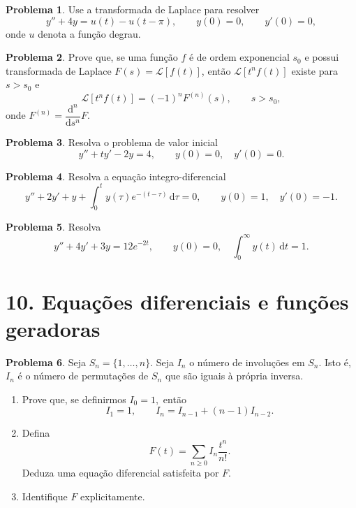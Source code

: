 \documentclass[10pt,a4paper]{amsart}
\renewcommand{\d}{\mathrm{d}}
\theoremstyle{definition}
\newtheorem{problema}{Problema}
\begin{document}
\begin{problema}
Use a transformada de Laplace para resolver
\[
    y''+4y=u(t)-u(t-\pi),
    \qquad y(0)=0,\qquad y'(0)=0,
\]
onde $u$ denota a função degrau.
\end{problema}

\begin{problema}
Prove que, se uma função $f$ é de ordem exponencial $s_0$ e possui
transformada de Laplace $F(s)=\mathcal{L}[f(t)]$, então
$\mathcal{L}[t^n f(t)]$ existe para $s>s_0$ e
\[
    \mathcal{L}[t^n f(t)]=(-1)^n F^{(n)}(s),\qquad s>s_0,
\]
onde $F^{(n)}=\dfrac{\d^n}{\d s^n}F$.
\end{problema}

\begin{problema}
Resolva o problema de valor inicial
\[
    y''+ty'-2y=4,\qquad y(0)=0,\quad y'(0)=0.
\]
\end{problema}

\begin{problema}
Resolva a equação integro-diferencial
\[
    y''+2y'+y+\int_0^t y(\tau)e^{-(t-\tau)}\,\d\tau=0,
    \qquad y(0)=1,\quad y'(0)=-1.
\]
\end{problema}

\begin{problema}
Resolva
\[
    y''+4y'+3y=12e^{-2t},\qquad y(0)=0,\quad \int_0^{\infty}y(t)\,\d t=1.
\]
\end{problema}

\section*{10. Equações diferenciais e funções geradoras}

\begin{problema} Seja $S_n = \{1,\dots,n\}.$
Seja $I_n$ o número de involuções em $S_n$. Isto é, $I_n$ é o número de permutações de $S_n$ que são iguais \`a própria inversa. 

\begin{enumerate}
    \item[(a)] Prove que, se definirmos $I_0 = 1,$ então
    \[
 I_1=1,\qquad I_n=I_{n-1}+(n-1)I_{n-2}.
\]
\item[(b)] Defina 
$$F(t)=\sum_{n\ge 0}I_n\frac{t^n}{n!}.$$
Deduza uma equação diferencial satisfeita por $F$. 
\item[(c)] Identifique $F$ explicitamente.
\end{enumerate}
\end{problema}
\end{document}
